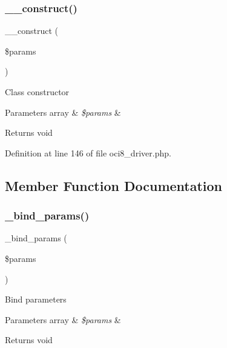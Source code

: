\subsubsection{\texorpdfstring{\_\_construct()}{\_\_construct()}}
{\footnotesize\ttfamily \+\_\+\+\_\+construct (\begin{DoxyParamCaption}\item[{}]{\$params }\end{DoxyParamCaption})}

Class constructor


\begin{DoxyParams}[1]{Parameters}
array & {\em \$params} & \\
\hline
\end{DoxyParams}
\begin{DoxyReturn}{Returns}
void 
\end{DoxyReturn}


Definition at line 146 of file oci8\+\_\+driver.\+php.



\subsection{Member Function Documentation}
\mbox{\label{class_c_i___d_b__oci8__driver_a66b8b06dadf7ff16c3877d5c024f5d2b}} 
\subsubsection{\texorpdfstring{\_bind\_params()}{\_bind\_params()}}
{\footnotesize\ttfamily \+\_\+bind\+\_\+params (\begin{DoxyParamCaption}\item[{}]{\$params }\end{DoxyParamCaption})\hspace{0.3cm}{\ttfamily [protected]}}

Bind parameters


\begin{DoxyParams}[1]{Parameters}
array & {\em \$params} & \\
\hline
\end{DoxyParams}
\begin{DoxyReturn}{Returns}
void 
\end{DoxyReturn}


